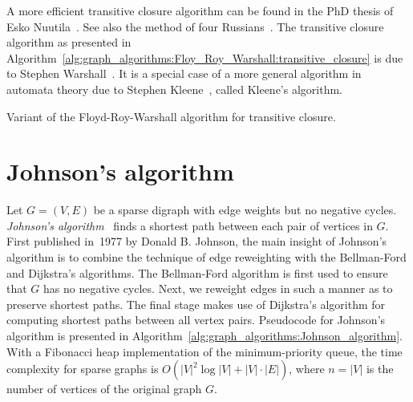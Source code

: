 A more efficient transitive closure algorithm can be found in the PhD
thesis of Esko Nuutila~\cite{Nuutila1995}. See
also the method of four Russians~\cite{AhoEtAl1974,ArlazarovEtAl1970}. The
transitive closure algorithm as presented in
Algorithm~\ref{alg:graph_algorithms:Floy_Roy_Warshall:transitive_closure}
is due to Stephen
Warshall~\cite{Warshall1962}. It is a special
case of a more general algorithm in automata
theory due to Stephen
Kleene~\cite{Kleene1956}, called Kleene's
algorithm.

\begin{algorithm}[!htbp]

\caption{Variant of the Floyd-Roy-Warshall algorithm for transitive closure.}
\label{alg:graph_algorithms:Floy_Roy_Warshall:transitive_closure}
\end{algorithm}



\section{Johnson's algorithm}

Let $G = (V,E)$ be a sparse digraph with edge
weights but no negative cycles.
\emph{Johnson's algorithm}~\cite{Johnson1977}
finds a shortest path between each pair of vertices in $G$. First
published in~1977 by Donald B. Johnson, the
main insight of Johnson's algorithm is to
combine the technique of edge reweighting with the
Bellman-Ford and
Dijkstra's algorithms. The Bellman-Ford
algorithm is first used to ensure that $G$ has no negative
cycles. Next, we reweight edges
in such a manner as to preserve shortest
paths. The final stage makes use of Dijkstra's
algorithm for computing shortest paths between all vertex
pairs. Pseudocode for Johnson's algorithm is presented in
Algorithm~\ref{alg:graph_algorithms:Johnson_algorithm}. With a
Fibonacci heap implementation of the
minimum-priority queue, the time
complexity for sparse graphs is
$O(|V|^2 \log |V| + |V| \cdot |E|)$, where $n = |V|$ is the number of
vertices of the original graph $G$.

